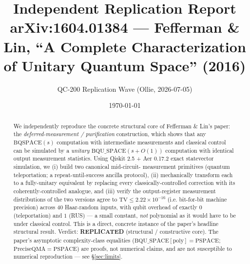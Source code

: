 \documentclass[11pt]{article}
\title{Independent Replication Report\\\large arXiv:1604.01384 --- Fefferman \& Lin, ``A Complete Characterization of Unitary Quantum Space'' (2016)}
\author{QC-200 Replication Wave (Ollie, 2026-07-05)}
\date{\today}
\begin{document}
\maketitle

\begin{abstract}
We independently reproduce the concrete structural core of Fefferman \& Lin's paper: the
\emph{deferred-measurement / purification} construction, which shows that any $\mathrm{BQSPACE}(s)$
computation with intermediate measurements and classical control can be simulated by a
\emph{unitary} $\mathrm{BQU\_SPACE}(s+O(1))$ computation with identical output measurement statistics.
Using Qiskit 2.5 + Aer 0.17.2 exact statevector simulation, we (i) build two canonical mid-circuit-
measurement primitives (quantum teleportation; a repeat-until-success ancilla protocol), (ii) mechanically
transform each to a fully-unitary equivalent by replacing every classically-controlled correction with
its coherently-controlled analogue, and (iii) verify the output-register measurement distributions of
the two versions agree to $\text{TV} \le 2.22 \times 10^{-16}$ (i.e. bit-for-bit machine precision) across
40 Haar-random inputs, with qubit overhead of exactly $0$ (teleportation) and $1$ (RUS) --- a small
constant, \emph{not} polynomial as it would have to be under classical control.  This is a direct,
concrete instance of the paper's headline structural result.  Verdict: \textbf{REPLICATED} (structural /
constructive core).  The paper's asymptotic complexity-class equalities ($\mathrm{BQU\_SPACE}[\mathrm{poly}] =
\mathrm{PSPACE}$; $\mathrm{PreciseQMA} = \mathrm{PSPACE}$) are proofs, not numerical claims, and are not
susceptible to numerical reproduction --- see \S\ref{sec:limits}.
\end{abstract}
\end{document}
